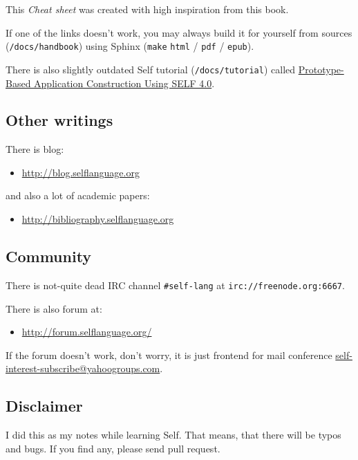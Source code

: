 \documentclass[10pt]{article}
\begin{document}
\begin{multicols*}{3}
This \textit{Cheat sheet} was created with high inspiration from this book.

If one of the links doesn't work, you may always build it for yourself from sources (\texttt{/docs/handbook}) using Sphinx (\texttt{make} \texttt{html} / \texttt{pdf} / \texttt{epub}).

There is also slightly outdated Self tutorial (\texttt{/docs/tutorial}) called \href{http://kitakitsune.org/bhole/self_tutorial/}{\footnotesize Prototype-Based Application Construction Using SELF 4.0}.



\subsection{Other writings}

There is blog:

\begin{itemize}[noitemsep]
\item \url{http://blog.selflanguage.org}
\end{itemize}

and also a lot of academic papers:

\begin{itemize}[noitemsep]
\item \url{http://bibliography.selflanguage.org}
\end{itemize}



\subsection{Community}
There is not-quite dead IRC channel \texttt{\#self-lang} at \texttt{irc://freenode.org:6667}.

There is also forum at:

\begin{itemize}[noitemsep]
\item \url{http://forum.selflanguage.org/}
\end{itemize}

If the forum doesn't work, don't worry, it is just frontend for mail conference \href{https://groups.yahoo.com/neo/groups/self-interest/info}{self-interest-subscribe@yahoogroups.com}.



\subsection{Disclaimer}
I did this as my notes while learning Self. That means, that there will be typos and bugs. If you find any, please send pull request.


\end{multicols*}
\end{document}
